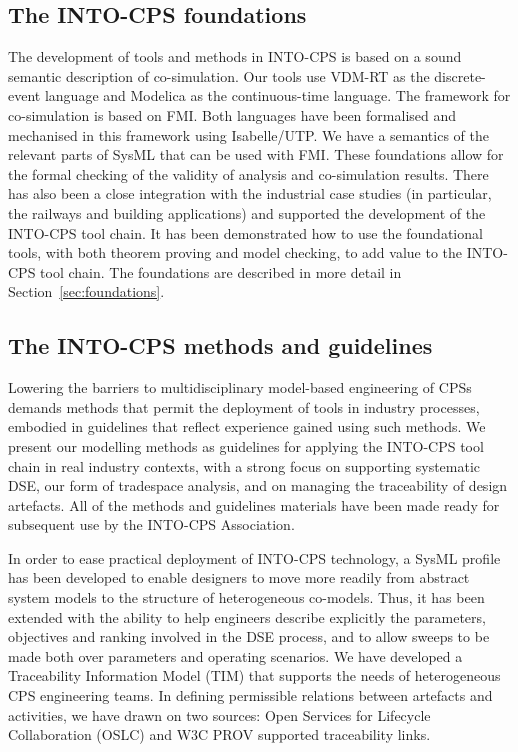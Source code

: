 \subsection{The INTO-CPS foundations}

The development of tools and methods in INTO-CPS is based on a sound semantic description of co-simulation. Our tools use VDM-RT as the discrete-event language and Modelica as the continuous-time language. The framework for co-simulation is based on FMI. Both languages have been formalised and mechanised in this framework using Isabelle/UTP. We have a semantics of the relevant parts of SysML that can be used with FMI. 
These foundations allow for the formal checking of the validity of analysis and co-simulation results. 
There has also been a close integration with the industrial case studies (in particular, the railways and building applications) and supported the development of the INTO-CPS tool chain. It has been demonstrated how to use the foundational tools, with both theorem proving and model checking, to add value to the INTO-CPS tool chain. The foundations are described in more detail in Section~\ref{sec:foundations}.

\subsection{The INTO-CPS methods and guidelines}

Lowering the barriers to multidisciplinary model-based engineering of CPSs demands methods that permit the deployment of tools in industry processes, embodied in guidelines that reflect experience gained using such methods. We present our modelling methods as guidelines for applying the INTO-CPS tool chain in real industry contexts, with a strong focus on supporting systematic DSE, our form of tradespace analysis, and on managing the traceability of design artefacts. All of the methods and guidelines materials have been made ready for subsequent use by the INTO-CPS Association.

In order to ease practical deployment of INTO-CPS technology, a SysML profile has been developed to enable designers to move more readily from abstract system models to the structure of heterogeneous co-models. Thus, it has been extended with the ability to help engineers describe explicitly the parameters, objectives and ranking involved in the DSE process, and to allow sweeps to be made both over parameters and operating scenarios. We have developed a Traceability Information Model (TIM) that supports the needs of heterogeneous CPS engineering teams. In defining permissible relations between artefacts and activities, we have drawn on two sources: Open Services for Lifecycle Collaboration (OSLC)  and W3C PROV supported traceability links.

